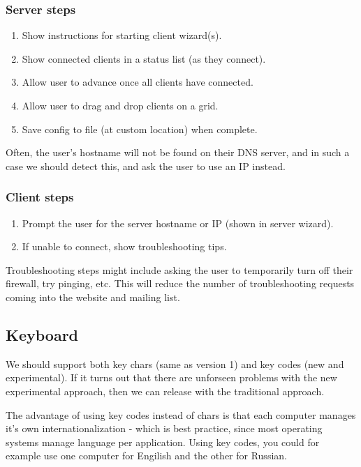 \subsubsection{Server steps}
\begin{enumerate}
  \item Show instructions for starting client wizard(s).
  \item Show connected clients in a status list (as they connect).
  \item Allow user to advance once all clients have connected.
  \item Allow user to drag and drop clients on a grid.
  \item Save config to file (at custom location) when complete.
\end{enumerate}

Often, the user's hostname will not be found on their DNS server, and in such
a case we should detect this, and ask the user to use an IP instead.

\subsubsection{Client steps}
\begin{enumerate}
  \item Prompt the user for the server hostname or IP (shown in server wizard).
  \item If unable to connect, show troubleshooting tips.
\end{enumerate}

Troubleshooting steps might include asking the user to temporarily turn off
their firewall, try pinging, etc. This will reduce the number of troubleshooting
requests coming into the website and mailing list.

\subsection{Keyboard}

We should support both key chars (same as version 1) and key codes (new and
experimental). If it turns out that there are unforseen problems with the
new experimental approach, then we can release with the traditional approach.

The advantage of using key codes instead of chars is that each computer manages
it's own internationalization - which is best practice, since most operating
systems manage language per application. Using key codes, you could for example 
use one computer for Engilish and the other for Russian.

